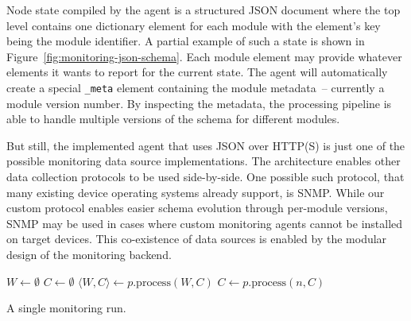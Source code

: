 \documentclass[5p,sort&compress]{elsarticle}
\begin{document}
Node state compiled by the agent is a structured JSON document where the top level contains one dictionary element for each module with the element's key being the module identifier.
A partial example of such a state is shown in Figure~\ref{fig:monitoring-json-schema}.
Each module element may provide whatever elements it wants to report for the current state.
The agent will automatically create a special \texttt{\_meta} element containing the module metadata~-- currently a module version number.
By inspecting the metadata, the processing pipeline is able to handle multiple versions of the schema for different modules.

But still, the implemented agent that uses JSON over HTTP(S) is just one of the possible monitoring data source implementations.
The architecture enables other data collection protocols to be used side-by-side.
One possible such protocol, that many existing device operating systems already support, is SNMP.
While our custom protocol enables easier schema evolution through per-module versions, SNMP may be used in cases where custom monitoring agents cannot be installed on target devices.
This co-existence of data sources is enabled by the modular design of the monitoring backend.

\begin{algorithm}[t]
\begin{algorithmic}
  \State $W \gets \emptyset$
  \State $C \gets \emptyset$
      \State $\langle W, C \rangle \gets p.\mathrm{process}(W, C)$
        \State $C \gets p.\mathrm{process}(n, C)$
      \EndFor
    \EndIf
  \EndFor
\EndProcedure
\end{algorithmic}
\caption{A single monitoring run.}
\label{alg:monitoring-pipeline}
\end{algorithm}
\end{document}
